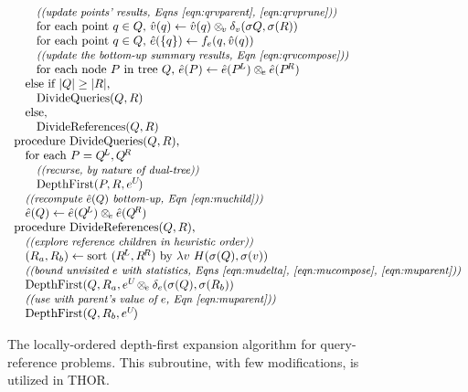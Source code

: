 \documentclass[twoside,leqno,twocolumn]{article}
\newcommand{\com}[1]{{\small \textit{((#1))}}}
\newcommand{\summary}{\delta}
\newcommand{\psty}{}
\newcommand{\X}{\\ \psty}
\newcommand{\x}{\X \hspace{0.13in}}
\newcommand{\xx}{\X \hspace{0.26in}}
\newcommand{\kdroot}[1]{#1^{\text{root}}}
\newcommand{\kdleft}[1]{#1^{\!L}}
\newcommand{\kdright}[1]{#1^{\!R}}
\newcommand{\nameop}[2]{#1_{\!#2}}
\newcommand{\myop}[1]{\nameop{\otimes}{#1}}
\newcommand{\letterqr}{v}
\newcommand{\outqr}{V}
\newcommand{\opqr}{\myop{\letterqr}}
\newcommand{\gqr}{g_{\letterqr}}
\newcommand{\letterqrv}{v}
\newcommand{\deltaqrv}{\summary_{\letterqrv}}
\newcommand{\varqr}{\hat{\letterqr}}
\newcommand{\varqrvparent}{\letterqrv^{P}}
\newcommand{\lettermu}{e}
\newcommand{\outopmu}{\myop{\lettermu}}
\newcommand{\opmu}{\myop{\lettermu}}
\newcommand{\fmu}{f_{\lettermu}}
\newcommand{\fmuv}{f_{\lettermu}}
\newcommand{\deltamu}{\summary_{\lettermu}}
\newcommand{\heurqr}{H}
\newcommand{\varmuchild}{\hat{\lettermu}}
\newcommand{\varmuparent}{\lettermu^{U\!}}
\newcommand{\outstat}{\sigma}
\begin{document}
\begin{figure}
\[\begin{array}[t]{l}
    \xx \text{\com{update points' results, Eqns \ref{eqn:qrvparent}, \ref{eqn:qrvprune}}}
    \xx \text{for each point }q \in Q\text{, }\varqr(q) \gets \varqr(q) \opqr \deltaqrv(\outstat{Q}, \outstat(R))
    \xx \text{for each point }q \in Q\text{, }\varmuchild(\{q\}) \gets \fmu(q, \varqr(q))
    \xx \text{\com{update the bottom-up summary results, Eqn \ref{eqn:qrvcompose}}}
    \xx \text{for each node }P\text{ in tree }Q\text{, }\varmuchild(P) \gets \varmuchild(\kdleft{P}) \outopmu \varmuchild(\kdright{P})
    \x \text{else if } |Q| \geq |R|\text{,}
    \xx \text{DivideQueries}(Q, R)
    \x \text{else,}
    \xx \text{DivideReferences}(Q, R)
    
    \X \text{procedure DivideQueries}(Q, R)\text{,}
    \x \text{for each } P = \kdleft{Q}, \kdright{Q}
    \xx \text{\com{recurse, by nature of dual-tree}}
    \xx \text{DepthFirst}(P, R, \varmuparent)
    \x \text{\com{recompute $\varmuchild(Q)$ bottom-up, Eqn~\ref{eqn:muchild}}}
    \x \varmuchild(Q) \gets \varmuchild(\kdleft{Q}) \outopmu \varmuchild(\kdright{Q})

    \X \text{procedure DivideReferences}(Q, R)\text{,}
    \x \text{\com{explore reference children in heuristic order}}
    \x (R_a, R_b) \gets \text{sort }(\kdleft{R}, \kdright{R})\text{ by }\lambda v ~ \heurqr(\outstat(Q), \outstat(v))
    \x \text{\com{bound unvisited $\lettermu$ with statistics, Eqns \ref{eqn:mudelta}, \ref{eqn:mucompose}, \ref{eqn:muparent}}}
    \x \text{DepthFirst}(Q, R_a, \varmuparent \opmu \deltamu(\outstat(Q), \outstat(R_b))
    \x \text{\com{use with parent's value of $\lettermu$, Eqn \ref{eqn:muparent}}}
    \x \text{DepthFirst}(Q, R_b, \varmuparent)
  \end{array}
\]
\caption{\label{fig:DepthFirst} The locally-ordered depth-first expansion algorithm for query-reference problems.
This subroutine, with few modifications, is utilized in THOR.
}
\end{figure}
\end{document}
